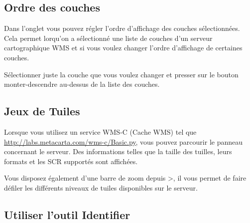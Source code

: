 \subsection{Ordre des couches} \label{sec:layerorder}

Dans l'onglet  vous pouvez régler l'ordre d'affichage des couches sélectionnées.
Cela permet lorqu'on a sélectionné une liste de couches d'un serveur cartographique WMS et si vous voulez
 changer l'ordre d'affichage de certaines couches.

Sélectionner juste la couche que vous voulez changer et presser sur le bouton monter-descendre au-dessus de la liste des couches.

\subsection{Jeux de Tuiles}\label{sec:tilesets}

Lorsque vous utilisez un service WMS-C (Cache WMS) tel que \url{http://labs.metacarta.com/wms-c/Basic.py}, vous pouvez parcourir le panneau  concernant le serveur. Des informations telles que la taille des tuilles, leurs formats et les SCR supportés sont affichées.

Vous disposez également d'une barre de zoom depuis >, il vous permet de faire défiler les différents niveaux de tuiles disponibles sur le serveur.

\subsection{Utiliser l'outil Identifier}\label{sec:ogc-wms-identify}

